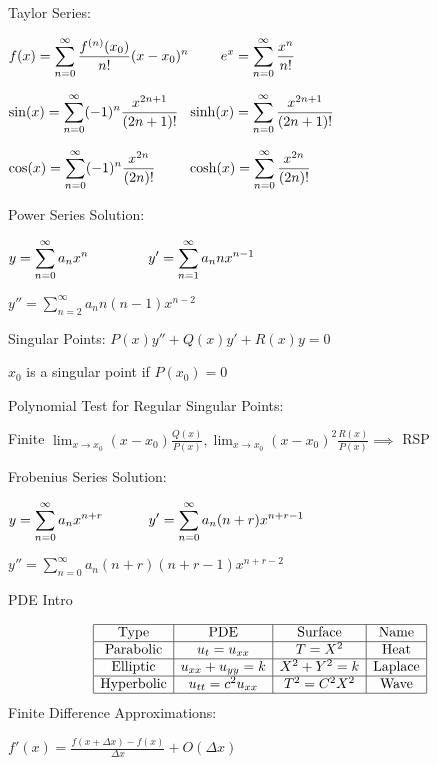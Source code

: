\documentclass[10pt]{article}
\makeatletter
\newcommand{\ds}{\displaystyle}
\newcommand{\tab}{\hspace{.02\textwidth}}
\newcommand{\twoEqn}[4]{$\makebox[#3][l]{$\ds #1$} \makebox[#4][l]{$\ds #2$}$}
\renewcommand{\section}{\@startsection{section}{1}{0ex}
                                {-2ex}
                                {0.7ex}
                                {\normalfont\large\bfseries}}
\makeatother
\begin{document}
\begin{multicols*}{3}
Taylor Series: 

\tab \twoEqn{f(x)=\sum_{n=0}^{\infty}\frac{f^{(n)}(x_0)}{n!}(x-x_0)^n}{e^x=\sum_{n=0}^\infty\frac{x^n}{n!}}{15.2em}{7em}

\tab \twoEqn{\sin(x)=\sum_{n=0}^\infty(-1)^n\frac{x^{2n+1}}{(2n+1)!}}{\sinh(x)=\sum_{n=0}^\infty\frac{x^{2n+1}}{(2n+1)!}}{13em}{10em}

\tab \twoEqn{\cos(x)=\sum_{n=0}^\infty(-1)^n\frac{x^{2n}}{(2n)!}}{\cosh(x)=\sum_{n=0}^\infty\frac{x^{2n}}{(2n)!}}{13em}{10em}

Power Series Solution:

\tab \twoEqn{y=\sum_{n=0}^\infty a_nx^n}{y'=\sum_{n=1}^\infty a_nnx^{n-1}}{10em}{10em}

\tab $y''=\sum_{n=2}^\infty a_nn(n-1)x^{n-2}$

\newcolumn

Singular Points: $P(x)y''+Q(x)y'+R(x)y=0$

\tab $x_0$ is a singular point if $P(x_0)=0$

Polynomial Test for Regular Singular Points:

\tab Finite $\lim_{x\to x_0}(x-x_0)\tfrac{Q(x)}{P(x)},\lim_{x\to x_0}(x-x_0)^2\tfrac{R(x)}{P(x)}\implies$ RSP

Frobenius Series Solution:

\tab \twoEqn{y=\sum_{n=0}^\infty a_nx^{n+r}}{y'=\sum_{n=0}^\infty a_n(n+r)x^{n+r-1}}{10em}{10em}

\tab $y''=\sum_{n=0}^\infty a_n(n+r)(n+r-1)x^{n+r-2}$

\section{PDE Intro}

\begingroup
\renewcommand{\arraystretch}{1.2}
\[\begin{array}{|c|c|c|c|} \hline \text{Type} & \text{PDE} & \text{Surface} & \text{Name} \\ \hline 
    \text{Parabolic} & u_t=u_{xx} & T=X^2 & \text{Heat} \\ \hline 
    \text{Elliptic} & u_{xx}+u_{yy}=k & X^2+Y^2=k & \text{Laplace} \\ \hline 
    \text{Hyperbolic} & u_{tt}=c^2u_{xx} & T^2=C^2X^2 & \text{Wave} \\ \hline
\end{array}\]
\endgroup
Finite Difference Approximations:

\tab $f'(x)=\frac{f(x+\Delta x)-f(x)}{\Delta x}+O(\Delta x)$


\end{multicols*}
\end{document}
